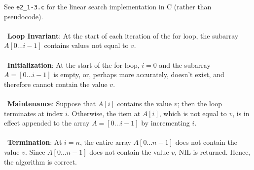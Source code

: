 See \texttt{e2\_1-3.c} for the linear search implementation in C (rather than pseudocode).
\\ \\
\noindent~\textbf{Loop Invariant}: At the start of each iteration of the for loop, the subarray $A[0 \ldots i-1]$ contains values not equal to $v$.
\\ \\
\noindent~\textbf{Initialization}: At the start of the for loop, $i=0$ and the subarray $A=[0 \ldots i-1]$ is empty, or, perhaps more accurately, doesn't exist, and therefore cannot contain the value $v$.
\\ \\
\noindent~\textbf{Maintenance}: Suppose that $A[i]$ contains the value $v$; then the loop terminates at index $i$. Otherwise, the item at $A[i]$, which is not equal to $v$, is in effect appended to the array $A=[0 \ldots i-1]$ by incrementing $i$.
\\ \\
\noindent~\textbf{Termination}: At $i=n$, the entire array $A[0 \ldots n-1]$ does not contain the value $v$. Since $A[0 \ldots n-1]$ does not contain the value $v$, NIL is returned. Hence, the algorithm is correct.
